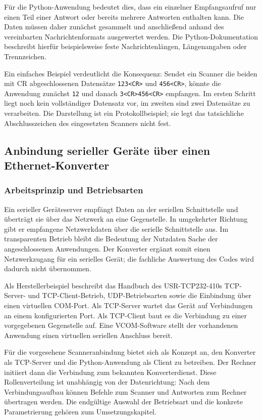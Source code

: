 Für die Python-Anwendung bedeutet dies, dass ein einzelner Empfangsaufruf nur einen Teil einer Antwort oder bereits mehrere Antworten enthalten kann. Die Daten müssen daher zunächst gesammelt und anschließend anhand des vereinbarten Nachrichtenformats ausgewertet werden. Die Python-Dokumentation beschreibt hierfür beispielsweise feste Nachrichtenlängen, Längenangaben oder Trennzeichen. \cite{python_socket_howto}

Ein einfaches Beispiel verdeutlicht die Konsequenz: Sendet ein Scanner die beiden mit CR abgeschlossenen Datensätze \texttt{123<CR>} und \texttt{456<CR>}, könnte die Anwendung zunächst \texttt{12} und danach \texttt{3<CR>456<CR>} empfangen. Im ersten Schritt liegt noch kein vollständiger Datensatz vor, im zweiten sind zwei Datensätze zu verarbeiten. Die Darstellung ist ein Protokollbeispiel; sie legt das tatsächliche Abschlusszeichen des eingesetzten Scanners nicht fest.

\subsection{Anbindung serieller Geräte über einen Ethernet-Konverter}
\label{sec:grundlagen_konverter}

\subsubsection{Arbeitsprinzip und Betriebsarten}

Ein serieller Geräteserver empfängt Daten an der seriellen Schnittstelle und überträgt sie über das Netzwerk an eine Gegenstelle. In umgekehrter Richtung gibt er empfangene Netzwerkdaten über die serielle Schnittstelle aus. Im transparenten Betrieb bleibt die Bedeutung der Nutzdaten Sache der angeschlossenen Anwendungen. Der Konverter ergänzt somit einen Netzwerkzugang für ein serielles Gerät; die fachliche Auswertung des Codes wird dadurch nicht übernommen.

Als Herstellerbeispiel beschreibt das Handbuch des USR-TCP232-410s TCP-Server- und TCP-Client-Betrieb, UDP-Betriebsarten sowie die Einbindung über einen virtuellen COM-Port. Als TCP-Server wartet das Gerät auf Verbindungen an einem konfigurierten Port. Als TCP-Client baut es die Verbindung zu einer vorgegebenen Gegenstelle auf. Eine VCOM-Software stellt der vorhandenen Anwendung einen virtuellen seriellen Anschluss bereit. \cite[Abschn.~2.2 und 2.3.2]{usr410s_grundlagen}

Für die vorgesehene Scanneranbindung bietet sich als Konzept an, den Konverter als TCP-Server und die Python-Anwendung als Client zu betreiben. Der Rechner initiiert dann die Verbindung zum bekannten Konverterdienst. Diese Rollenverteilung ist unabhängig von der Datenrichtung: Nach dem Verbindungsaufbau können Befehle zum Scanner und Antworten zum Rechner übertragen werden. Die endgültige Auswahl der Betriebsart und die konkrete Parametrierung gehören zum Umsetzungskapitel.

